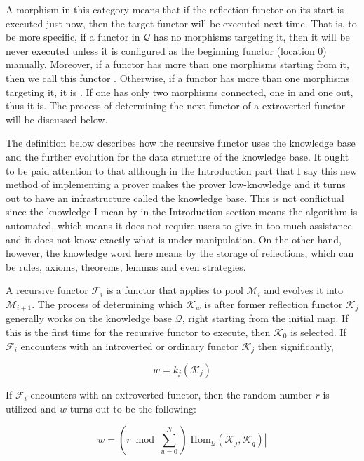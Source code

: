 \documentclass{article}
\begin{document}
A morphism in this category means that if the reflection functor on its start is executed just now, then the target functor will be executed next time. That is, to be more specific, if a functor in \(\mathcal{Q}\) has no morphisms targeting it, then it will be never executed unless it is configured as the beginning functor (location \(0\)) manually. Moreover, if a functor has more than one morphisms starting from it, then we call this functor . Otherwise, if a functor has more than one morphisms targeting it, it is . If one has only two morphisms connected, one in and one out, thus it is. The process of determining the next functor of a extroverted functor will be discussed below.

The definition below describes how the recursive functor uses the knowledge base and the further evolution for the data structure of the knowledge base. It ought to be paid attention to that although in the Introduction part that I say this new method of implementing a prover makes the prover low-knowledge and it turns out to have an infrastructure called the knowledge base. This is not conflictual since the knowledge I mean by in the Introduction section means the algorithm is automated, which means it does not require users to give in too much assistance and it does not know exactly what is under manipulation. On the other hand, however, the knowledge word here means by the storage of reflections, which can be rules, axioms, theorems, lemmas and even strategies.

A recursive functor \(\mathcal{F}_i\) is a functor that applies to pool \(\mathcal{M}_i\) and evolves it into \(\mathcal{M}_{i+1}\). The process of determining which \(\mathcal{K}_w\) is  after former reflection functor \(\mathcal{K}_j\) generally works on the knowledge base \(\mathcal{Q}\), right starting from the initial map. If this is the first time for the recursive functor to execute, then \(\mathcal{K}_0\) is selected. If \(\mathcal{F}_i\) encounters with an introverted or ordinary functor \(\mathcal{K}_j\) then significantly,

\[w = k_j\left(\mathcal{K}_j\right)\]

If \(\mathcal{F}_i\) encounters with an extroverted functor, then the random number \(\mathit{r}\) is utilized and \(w\) turns out to be the following:

\[w = (\mathit{r} \bmod \sum _{u=0}^N )\left|\text{Hom}_{\mathcal{Q}}\left(\mathcal{K}_j,\mathcal{K}_q\right)\right|\]
\end{document}
